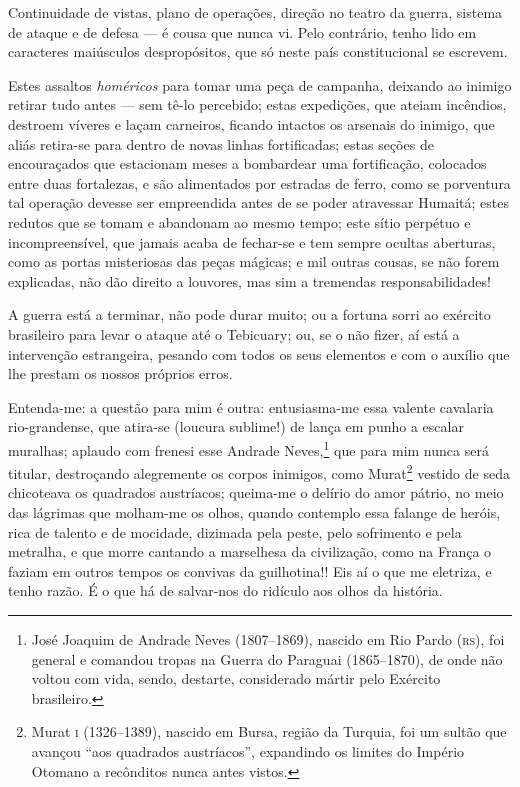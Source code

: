 {Continuidade de vistas, plano de operações, direção no teatro da guerra,
sistema de ataque e de defesa --- é cousa que nunca vi. Pelo contrário,
tenho lido em caracteres maiúsculos despropósitos, que só neste país
constitucional se escrevem.

Estes assaltos \emph{homéricos} para tomar uma peça de campanha,
deixando ao inimigo retirar tudo antes --- sem tê-lo percebido; estas
expedições, que ateiam incêndios, destroem víveres e laçam carneiros,
ficando intactos os arsenais do inimigo, que aliás retira-se para dentro
de novas linhas fortificadas; estas seções de encouraçados que
estacionam meses a bombardear uma fortificação, colocados entre duas
fortalezas, e são alimentados por estradas de ferro, como se porventura
tal operação devesse ser empreendida antes de se poder atravessar
Humaitá; estes redutos que se tomam e abandonam ao mesmo tempo; este
sítio perpétuo e incompreensível, que jamais acaba de fechar-se e tem
sempre ocultas aberturas, como as portas misteriosas das peças mágicas;
e mil outras cousas, se não forem explicadas, não dão direito a
louvores, mas sim a tremendas responsabilidades!

A guerra está a terminar, não pode durar muito; ou a fortuna sorri ao
exército brasileiro para levar o ataque até o Tebicuary; ou, se o não
fizer, aí está a intervenção estrangeira, pesando com todos os seus
elementos e com o auxílio que lhe prestam os nossos próprios erros.

Entenda-me: a questão para mim é outra: entusiasma-me essa valente
cavalaria rio-grandense, que atira-se (loucura sublime!) de lança em
punho a escalar muralhas; aplaudo com frenesi esse Andrade
Neves,\footnote{José Joaquim de Andrade Neves (1807--1869), nascido em
  Rio Pardo (\textsc{rs}), foi general e comandou tropas na Guerra do Paraguai
  (1865--1870), de onde não voltou com vida, sendo, destarte, considerado
  mártir pelo Exército brasileiro.} que para mim nunca será titular,
destroçando alegremente os corpos inimigos, como Murat\footnote{Murat
  \textsc{i} (1326--1389), nascido em Bursa, região da Turquia, foi um sultão que
  avançou ``aos quadrados austríacos'', expandindo os limites do Império
  Otomano a recônditos nunca antes vistos.} vestido de seda chicoteava
os quadrados austríacos; queima-me o delírio do amor pátrio, no meio das
lágrimas que molham-me os olhos, quando contemplo essa falange de
heróis, rica de talento e de mocidade, dizimada pela peste, pelo
sofrimento e pela metralha, e que morre cantando a marselhesa da
civilização, como na França o faziam em outros tempos os convivas da
guilhotina!! Eis aí o que me eletriza, e tenho razão. É o que há de
salvar-nos do ridículo aos olhos da história.

}
